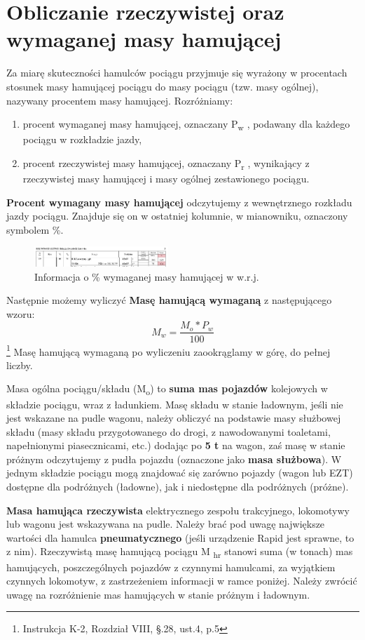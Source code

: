 \chapter{Obliczanie rzeczywistej oraz wymaganej masy hamującej}
Za miarę skuteczności hamulców pociągu przyjmuje się wyrażony w procentach stosunek masy hamującej pociągu do masy pociągu (tzw. masy ogólnej),
nazywany procentem masy hamującej. Rozróżniamy:
\begin{enumerate}
	\item procent wymaganej masy hamującej, oznaczany P\textsubscript{w} , podawany dla każdego pociągu w rozkładzie jazdy,
	\item procent rzeczywistej masy hamującej, oznaczany P\textsubscript{r} , wynikający z rzeczywistej masy hamującej i masy ogólnej zestawionego pociągu.
\end{enumerate}

\textbf{Procent wymagany masy hamującej} odczytujemy z wewnętrznego rozkładu jazdy pociągu. Znajduje się on w ostatniej kolumnie, w mianowniku, oznaczony symbolem \%. 
\begin{figure}
	\includegraphics[width=0.45\textwidth]{skryptkierownik-img/skryptkierownik-img065.png}
	\caption{Informacja o \% wymaganej masy hamującej w w.r.j.}
	\label{fig:pw}
\end{figure}

Następnie możemy wyliczyć \textbf{Masę hamującą wymaganą} z następującego wzoru:
\[  M_{w}=\frac{M_{o}*P_{w}}{100} \label{wzr:mhw}  \]
\footnote{Instrukcja K-2, Rozdział VIII, \S.28, ust.4, p.5}
Masę hamującą wymaganą po wyliczeniu zaookrąglamy w górę, do pełnej liczby.

Masa ogólna pociągu/składu (M\textsubscript{o}) to \textbf{suma mas pojazdów} kolejowych w składzie pociągu, wraz z ładunkiem. Masę składu w stanie ładownym, jeśli nie jest wskazane na pudle wagonu, należy obliczyć na podstawie masy służbowej składu (masy składu przygotowanego do drogi, z nawodowanymi toaletami, napełnionymi piasecznicami, etc.) dodając po \textbf{5 t} na wagon, zaś masę w stanie próżnym odczytujemy z pudła pojazdu (oznaczone jako \textbf{masa służbowa}). W jednym składzie pociągu mogą znajdować się zarówno pojazdy (wagon lub EZT) dostępne dla podróżnych (ładowne), jak i niedostępne dla podróżnych (próżne).

\textbf{Masa hamująca rzeczywista} elektrycznego zespołu trakcyjnego, lokomotywy lub wagonu jest wskazywana na pudle. Należy brać pod uwagę największe wartości dla hamulca \textbf{pneumatycznego} (jeśli urządzenie Rapid jest sprawne, to z nim). Rzeczywistą masę hamującą pociągu M\textsubscript{ hr} stanowi suma (w tonach) mas hamujących, poszczególnych pojazdów z czynnymi hamulcami, za wyjątkiem czynnych lokomotyw, z zastrzeżeniem informacji w ramce poniżej. Należy zwrócić uwagę na rozróżnienie mas hamujących w stanie próżnym i ładownym.

